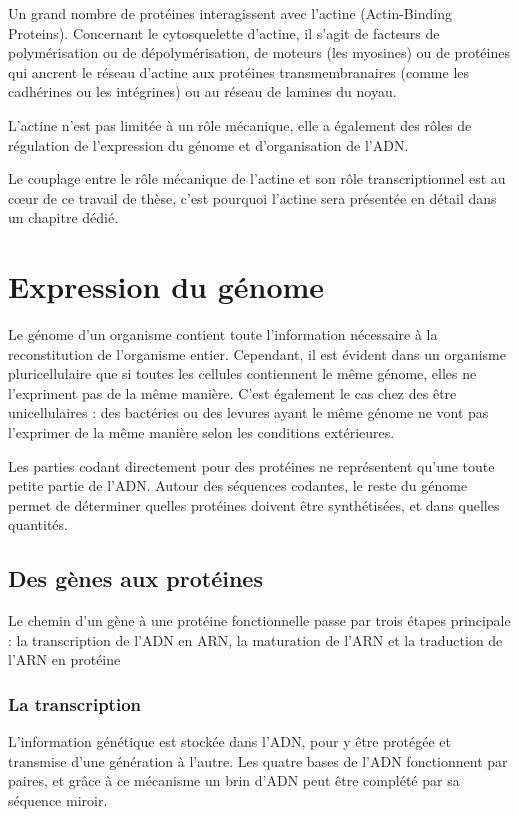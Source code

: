 \documentclass{report}
\begin{document}
Un grand nombre de protéines interagissent avec l'actine (Actin-Binding Proteins). Concernant le cytosquelette d'actine, il s'agit de facteurs de polymérisation ou de dépolymérisation, de moteurs (les myosines) ou de protéines qui ancrent le réseau d'actine aux protéines transmembranaires (comme les cadhérines ou les intégrines) ou au réseau de lamines du noyau. 

L'actine n'est pas limitée à un rôle mécanique, elle a également des rôles de régulation de l'expression du génome et d'organisation de l'ADN. 

Le couplage entre le rôle mécanique de l'actine et son rôle transcriptionnel est au c\oe ur de ce travail de thèse, c'est pourquoi l'actine sera présentée en détail dans un chapitre dédié. 




\section{Expression du génome}

Le génome d'un organisme contient toute l'information nécessaire à la reconstitution de l'organisme entier. Cependant, il est évident dans un organisme pluricellulaire que si toutes les cellules contiennent le même génome, elles ne l'expriment pas de la même manière. C'est également le cas chez des être unicellulaires : des bactéries ou des levures ayant le même génome ne vont pas l'exprimer de la même manière selon les conditions extérieures. 

Les parties codant directement pour des protéines ne représentent qu'une toute petite partie de l'ADN. Autour des séquences codantes, le reste du génome permet de déterminer quelles protéines doivent être synthétisées, et dans quelles quantités. 

\subsection{Des gènes aux protéines}

Le chemin d'un gène à une protéine fonctionnelle passe par trois étapes principale : la transcription de l'ADN en ARN, la maturation de l'ARN et la traduction de l'ARN en protéine 

\subsubsection{La transcription}

L'information génétique est stockée dans l'ADN, pour y être protégée et transmise d'une génération à l'autre. Les quatre bases de l'ADN fonctionnent par paires, et grâce à ce mécanisme un brin d'ADN peut être complété par sa séquence miroir. 
\end{document}
